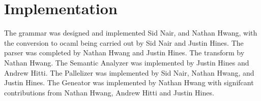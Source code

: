 \section{Implementation}
The grammar was designed and implemented Sid Nair, and Nathan Hwang, with the
conversion to ocaml being carried out by Sid Nair and Justin Hines.  The parser was
completed by Nathan Hwang and Justin Hines.  The transform by Nathan Hwang.  The
Semantic Analyzer was implemented by Justin Hines and Andrew Hitti.  The Pallelizer was
implemented by Sid Nair, Nathan Hwang, and Justin Hines. The Geneator was 
implemented by Nathan Hwang with signifcant contributions from Nathan Hwang, 
Andrew Hitti and Justin Hines.





